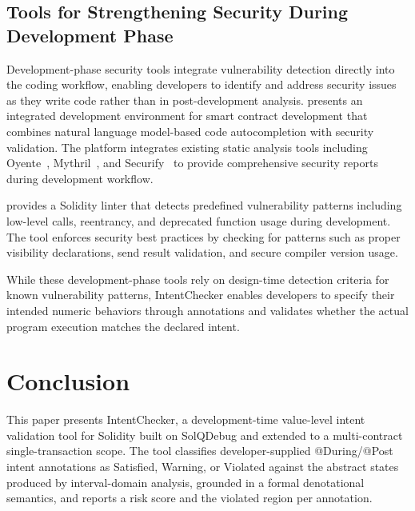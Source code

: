 \documentclass[pdflatex,sn-basic]{sn-jnl}%
\theoremstyle{thmstyleone}%
\theoremstyle{thmstyletwo}%
\theoremstyle{thmstylethree}%
\begin{document}
\subsection{Tools for Strengthening Security During Development Phase}
Development-phase security tools integrate vulnerability detection directly into the coding workflow, enabling developers to identify and address security issues as they write code rather than in post-development analysis.
\citep{making} presents an integrated development environment for smart contract development that combines natural language model-based code autocompletion with security validation.
The platform integrates existing static analysis tools including Oyente~\citep{oyente}, Mythril~\citep{mythril}, and Securify~\citep{securify} to provide comprehensive security reports during development workflow.

\citep{solhint} provides a Solidity linter that detects predefined vulnerability patterns including low-level calls, reentrancy, and deprecated function usage during development.
The tool enforces security best practices by checking for patterns such as proper visibility declarations, send result validation, and secure compiler version usage.

While these development-phase tools rely on design-time detection criteria for known vulnerability patterns,
IntentChecker enables developers to specify their intended numeric behaviors through annotations and validates whether the actual program execution matches the declared intent.

\section{Conclusion}\label{sec:conclusion}

This paper presents IntentChecker, a development-time value-level intent validation tool for Solidity built on SolQDebug and extended to a multi-contract single-transaction scope. The tool classifies developer-supplied @During/@Post intent annotations as Satisfied, Warning, or Violated against the abstract states produced by interval-domain analysis, grounded in a formal denotational semantics, and reports a risk score and the violated region per annotation.
\end{document}
